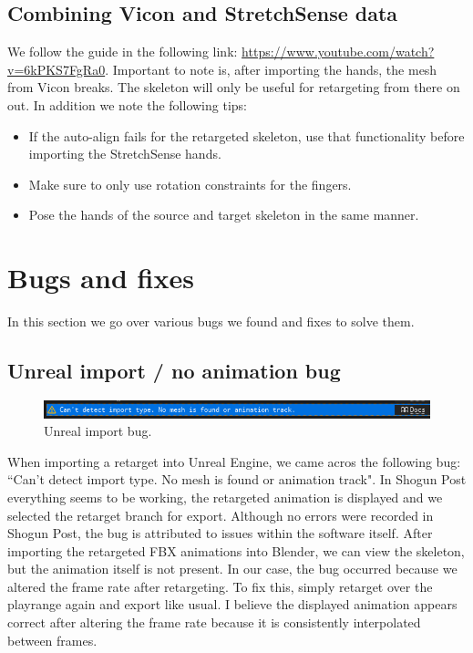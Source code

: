 \documentclass{uva-inf-article}
\begin{document}
\subsection{Combining Vicon and StretchSense data}
We follow the guide in the following link: \url{https://www.youtube.com/watch?v=6kPKS7FgRa0}. Important to note is, after importing the hands, the mesh from Vicon breaks. The skeleton will only be useful for retargeting from there on out. In addition we note the following tips:
\begin{itemize}
    \item If the auto-align fails for the retargeted skeleton, use that functionality before importing the StretchSense hands.
    \item Make sure to only use rotation constraints for the fingers.
    \item Pose the hands of the source and target skeleton in the same manner.
\end{itemize}


\section{Bugs and fixes}
In this section we go over various bugs we found and fixes to solve them.

\subsection{Unreal import / no animation bug}
\begin{figure}[hbt!]
    \centering
    \includegraphics[width=\textwidth]{imgs/UEImportBug.png}
    \caption{Unreal import bug.}
    \label{fig:importBugUE}
\end{figure}
When importing a retarget into Unreal Engine, we came acros the following bug: ``Can't detect import type. No mesh is found or animation track". In Shogun Post everything seems to be working, the retargeted animation is displayed and we selected the retarget branch for export. Although no errors were recorded in Shogun Post, the bug is attributed to issues within the software itself. After importing the retargeted FBX animations into Blender, we can view the skeleton, but the animation itself is not present. In our case, the bug occurred because we altered the frame rate after retargeting. To fix this, simply retarget over the playrange again and export like usual. I believe the displayed animation appears correct after altering the frame rate because it is consistently interpolated between frames.
\end{document}
